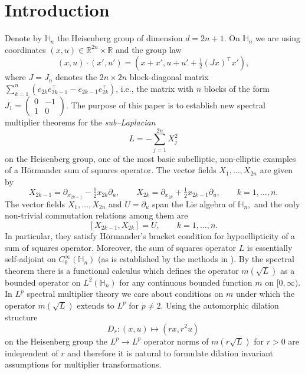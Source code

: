 \documentclass[leqno]{amsart}
\theoremstyle{definition}
\theoremstyle{remark}
\numberwithin{equation}{section}
\newcommand\bbH{{\mathbb {H}}}
\newcommand\bbR{{\mathbb {R}}}
\begin{document}
\tableofcontents

\section{Introduction}

Denote by  $\bbH_n$  the Heisenberg group of dimension $d=2n+1$. On $\bbH_n$ we are using  coordinates $(x,u)\in \bbR^{2n}\times \bbR$ and the group law 
\begin{equation}\label{eq:grouplaw} 
(x,u)\cdot  (x',u')= (x+x', u+u'+\tfrac 12 (Jx)^\intercal  x'),
\end{equation}
where $J=J_n$ denotes  the $2n\times 2n$ block-diagonal matrix $\sum_{k=1}^n (e_{2k} e_{2k-1}^\intercal - e_{2k-1} e_{2k}^\intercal)  $, i.e., the matrix with $n$  blocks  of the form $J_1=( \begin{smallmatrix} 0&-1\\ 1&0\end{smallmatrix})$. 
The purpose of this paper is to   establish  new spectral multiplier theorems for the \textit{sub--Laplacian} 
 \[L=-\sum_{j=1}^{2n} X_j^2\] 
on the Heisenberg group, one of the most basic subelliptic, non-elliptic examples of a  Hörmander sum of squares operator.
The vector fields $X_1,\dots,X_{2n}$ are given by
\[
X_{2k-1}=\partial_{x_{2k-1}}-\tfrac12 x_{2k}\partial_u,
\qquad
X_{2k}=\partial_{x_{2k}}+\tfrac12 x_{2k-1}\partial_u,
\qquad
k=1,\dots,n.
\]
The vector fields $X_1,\dots, X_{2n}$ and $U=\partial_u$ span the Lie algebra of $\bbH_n,$
 and the only non-trivial commutation relations among them are 
\[
 [X_{2k-1},X_{2k}]=U, \qquad k=1,\dots,n.
\]
In particular, they satisfy Hörmander's bracket condition for hypoellipticity of a sum of squares operator. 
Moreover, the sum of squares operator $L$ is essentially self-adjoint on $C^\infty_0(\bbH_n)$ (as is established  by the methods in \cite{NelsonStinespring}).  By the spectral theorem there is a functional calculus which defines the operator $m(\sqrt L)$  as a bounded operator on $L^2(\bbH_n)$ for any continuous bounded function $m$ on $[0,\infty)$. In $L^p$ spectral multiplier theory we care about conditions on $m$ under which  the operator $m(\sqrt L)$ extends to $L^p$ for $p\neq 2$.  Using the automorphic dilation structure \[ D_r: (x,u)\mapsto (rx, r^2 u)\] on the Heisenberg group the $L^p\to L^p$ operator norms of $m(r\sqrt L)$ for $r>0$ are independent of $r$ and therefore it is natural to formulate dilation invariant assumptions for multiplier transformations.
\end{document}
